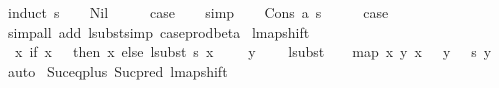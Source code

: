 \begin{isabellebody}
%
\isadelimproof
%
\endisadelimproof
%
\isatagproof
{}\isamarkupfalse%
\ {\isacharparenleft}{\kern0pt}induct\ s{\isacharparenright}{\kern0pt}\isanewline
\ \ \isamarkupfalse%
\ Nil\isanewline
\ \ \isamarkupfalse%
\ \isamarkupfalse%
\ {\isacharquery}{\kern0pt}case\isanewline
\ \ \isamarkupfalse%
\ simp\isanewline
{}\isamarkupfalse%
\isanewline
\ \ \isamarkupfalse%
\ {\isacharparenleft}{\kern0pt}Cons\ a\ s{\isacharparenright}{\kern0pt}\isanewline
\ \ \isamarkupfalse%
\ \isamarkupfalse%
\ {\isacharquery}{\kern0pt}case\isanewline
\ \ \isamarkupfalse%
\ {\isacharparenleft}{\kern0pt}simp{\isacharunderscore}{\kern0pt}all\ add{\isacharcolon}{\kern0pt}\ lsubst{\isacharunderscore}{\kern0pt}simp\ case{\isacharunderscore}{\kern0pt}prod{\isacharunderscore}{\kern0pt}beta{\isacharparenright}{\kern0pt}\isanewline
{}\isamarkupfalse%
%
\endisatagproof
{\isafoldproof}%
%
\isadelimproof
\isanewline
%
\endisadelimproof
\isanewline
\isanewline
{}\isamarkupfalse%
\ lmap{\isacharunderscore}{\kern0pt}shift{}{\isacharcolon}{\kern0pt}\isanewline
\ \ {\isachardoublequoteopen}{\isacharparenleft}{\kern0pt}{\isasymlambda}x{\isachardot}{\kern0pt}\ if\ x\ {\isacharequal}{\kern0pt}\ {}\ then\ x\ else\ {\isacharparenleft}{\kern0pt}{\isacharparenleft}{\kern0pt}lsubst\ s{\isacharparenright}{\kern0pt}\ {\isacharparenleft}{\kern0pt}x\ {\isacharminus}{\kern0pt}\ {}{\isacharparenright}{\kern0pt}\ {\isacharplus}{\kern0pt}\ {}{\isacharparenright}{\kern0pt}{\isacharparenright}{\kern0pt}\ y\ {\isacharequal}{\kern0pt}\isanewline
\ \ \ lsubst\ {\isacharparenleft}{\kern0pt}{\isacharparenleft}{\kern0pt}{}{\isacharcomma}{\kern0pt}\ {}{\isacharparenright}{\kern0pt}\ {\isacharhash}{\kern0pt}\ map\ {\isacharparenleft}{\kern0pt}{\isasymlambda}{\isacharparenleft}{\kern0pt}x{\isacharcomma}{\kern0pt}\ y{\isacharparenright}{\kern0pt}{\isachardot}{\kern0pt}\ {\isacharparenleft}{\kern0pt}x\ {\isacharplus}{\kern0pt}\ {}{\isacharcomma}{\kern0pt}\ y\ {\isacharplus}{\kern0pt}\ {}{\isacharparenright}{\kern0pt}{\isacharparenright}{\kern0pt}\ s{\isacharparenright}{\kern0pt}\ y{\isachardoublequoteclose}\isanewline
%
\isadelimproof
%
\endisadelimproof
%
\isatagproof
{}\isamarkupfalse%
\ auto\isanewline
{}\isamarkupfalse%
\ Suc{\isacharunderscore}{\kern0pt}eq{\isacharunderscore}{\kern0pt}plus{}\ Suc{\isacharunderscore}{\kern0pt}pred\ lmap{\isacharunderscore}{\kern0pt}shift\ \isamarkupfalse%

\end{isabellebody}
